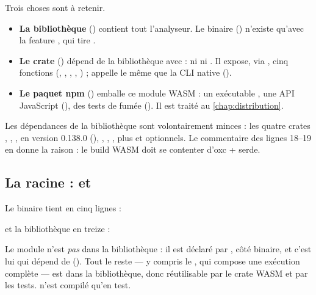 Trois choses sont à retenir.
\begin{itemize}
  \item \textbf{La bibliothèque } () contient tout l'analyseur. Le binaire  () n'existe qu'avec la feature , qui tire .
  \item \textbf{Le crate } () dépend de la bibliothèque avec  : ni  ni . Il expose, via , cinq fonctions (, , , , ) ;  appelle le même  que la CLI native ().
  \item \textbf{Le paquet npm } () emballe ce module WASM : un exécutable , une API JavaScript (), des tests de fumée (). Il est traité au \cref{chap:distribution}.
\end{itemize}

Les dépendances de la bibliothèque sont volontairement minces : les quatre crates , , ,  en version 0.138.0 (), , , , plus  et  optionnels. Le commentaire des lignes 18--19 en donne la raison : le build WASM doit se contenter d'\og oxc + serde\fg{}.

\subsection{La racine :  et }

Le binaire tient en cinq lignes :


et la bibliothèque en treize :


Le module  n'est \emph{pas} dans la bibliothèque : il est déclaré par , côté binaire, et c'est lui qui dépend de  (). Tout le reste --- y compris le , qui compose une exécution complète --- est dans la bibliothèque, donc réutilisable par le crate WASM et par les tests.  n'est compilé qu'en test.

